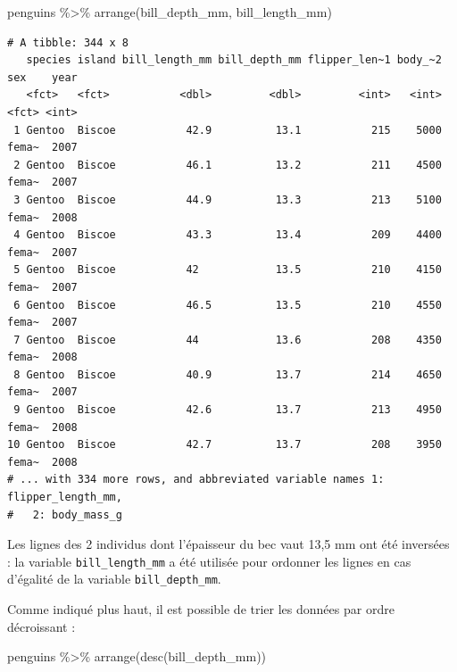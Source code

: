 \documentclass[
  letterpaper,
  DIV=11,
  numbers=noendperiod]{scrreprt}
\newenvironment{Shaded}{\begin{snugshade}}{\end{snugshade}}
\newcommand{\FunctionTok}[1]{\textcolor[rgb]{0.28,0.35,0.67}{#1}}
\newcommand{\NormalTok}[1]{\textcolor[rgb]{0.00,0.23,0.31}{#1}}
\newcommand{\SpecialCharTok}[1]{\textcolor[rgb]{0.37,0.37,0.37}{#1}}
\begin{document}
\begin{Shaded}
\begin{Highlighting}[]
\NormalTok{penguins }\SpecialCharTok{\%\textgreater{}\%}
  \FunctionTok{arrange}\NormalTok{(bill\_depth\_mm, bill\_length\_mm)}
\end{Highlighting}
\end{Shaded}

\begin{verbatim}
# A tibble: 344 x 8
   species island bill_length_mm bill_depth_mm flipper_len~1 body_~2 sex    year
   <fct>   <fct>           <dbl>         <dbl>         <int>   <int> <fct> <int>
 1 Gentoo  Biscoe           42.9          13.1           215    5000 fema~  2007
 2 Gentoo  Biscoe           46.1          13.2           211    4500 fema~  2007
 3 Gentoo  Biscoe           44.9          13.3           213    5100 fema~  2008
 4 Gentoo  Biscoe           43.3          13.4           209    4400 fema~  2007
 5 Gentoo  Biscoe           42            13.5           210    4150 fema~  2007
 6 Gentoo  Biscoe           46.5          13.5           210    4550 fema~  2007
 7 Gentoo  Biscoe           44            13.6           208    4350 fema~  2008
 8 Gentoo  Biscoe           40.9          13.7           214    4650 fema~  2007
 9 Gentoo  Biscoe           42.6          13.7           213    4950 fema~  2008
10 Gentoo  Biscoe           42.7          13.7           208    3950 fema~  2008
# ... with 334 more rows, and abbreviated variable names 1: flipper_length_mm,
#   2: body_mass_g
\end{verbatim}

Les lignes des 2 individus dont l'épaisseur du bec vaut 13,5 mm ont été
inversées : la variable \texttt{bill\_length\_mm} a été utilisée pour
ordonner les lignes en cas d'égalité de la variable
\texttt{bill\_depth\_mm}.

Comme indiqué plus haut, il est possible de trier les données par ordre
décroissant :

\begin{Shaded}
\begin{Highlighting}[]
\NormalTok{penguins }\SpecialCharTok{\%\textgreater{}\%}
  \FunctionTok{arrange}\NormalTok{(}\FunctionTok{desc}\NormalTok{(bill\_depth\_mm))}
\end{Highlighting}
\end{Shaded}
\end{document}
